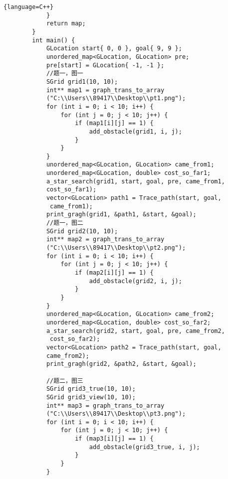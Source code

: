 \documentclass[withoutpreface,bwprint]{cumcmthesis} %
\begin{document}
\begin{appendix}
\begin{lstlisting}{language=C++}
            }
            return map;
        }
        int main() {
            GLocation start{ 0, 0 }, goal{ 9, 9 };
            unordered_map<GLocation, GLocation> pre;
            pre[start] = GLocation{ -1, -1 };
            //题一，图一
            SGrid grid1(10, 10);
            int** map1 = graph_trans_to_array
            ("C:\\Users\\89417\\Desktop\\pt1.png");
            for (int i = 0; i < 10; i++) {
                for (int j = 0; j < 10; j++) {
                    if (map1[i][j] == 1) {
                        add_obstacle(grid1, i, j);
                    }
                }
            }
            unordered_map<GLocation, GLocation> came_from1;
            unordered_map<GLocation, double> cost_so_far1;
            a_star_search(grid1, start, goal, pre, came_from1, 
            cost_so_far1);
            vector<GLocation> path1 = Trace_path(start, goal,
             came_from1);
            print_gragh(grid1, &path1, &start, &goal);
            //题一，图二
            SGrid grid2(10, 10);
            int** map2 = graph_trans_to_array
            ("C:\\Users\\89417\\Desktop\\pt2.png");
            for (int i = 0; i < 10; i++) {
                for (int j = 0; j < 10; j++) {
                    if (map2[i][j] == 1) {
                        add_obstacle(grid2, i, j);
                    }
                }
            }
            unordered_map<GLocation, GLocation> came_from2;
            unordered_map<GLocation, double> cost_so_far2;
            a_star_search(grid2, start, goal, pre, came_from2,
             cost_so_far2);
            vector<GLocation> path2 = Trace_path(start, goal, 
            came_from2);
            print_gragh(grid2, &path2, &start, &goal);
        
            //题二，图三
            SGrid grid3_true(10, 10);
            SGrid grid3_view(10, 10);
            int** map3 = graph_trans_to_array
            ("C:\\Users\\89417\\Desktop\\pt3.png");
            for (int i = 0; i < 10; i++) {
                for (int j = 0; j < 10; j++) {
                    if (map3[i][j] == 1) {
                        add_obstacle(grid3_true, i, j);
                    }
                }
            }
        

\end{lstlisting}
\end{appendix}
\end{document}
